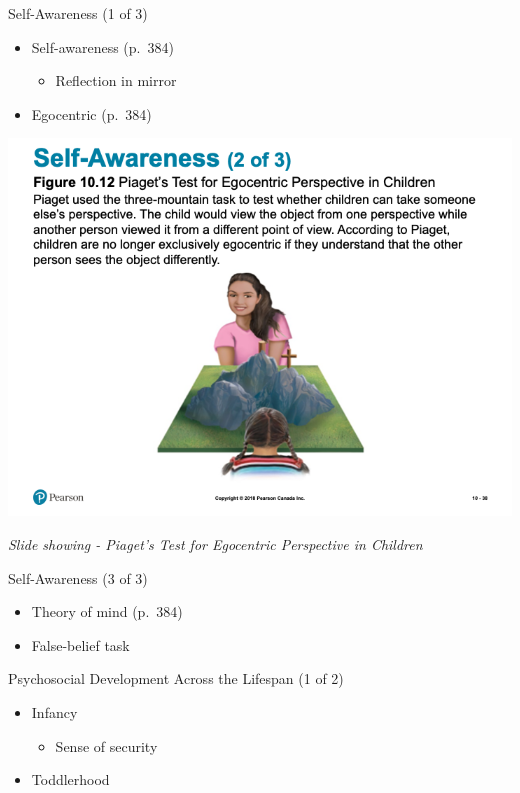 \documentclass[
]{book}
\providecommand{\tightlist}{%
  \setlength{\itemsep}{0pt}\setlength{\parskip}{0pt}}
\begin{document}
\begin{reflect}
Self-Awareness (1 of 3)

\begin{itemize}
\tightlist
\item
  Self-awareness (p.~384)

  \begin{itemize}
  \tightlist
  \item
    Reflection in mirror\\
  \end{itemize}
\item
  Egocentric (p.~384)
\end{itemize}

\includegraphics{assets/unit_3/slide_38.png}

\emph{Slide showing - Piaget's Test for Egocentric Perspective in Children}

Self-Awareness (3 of 3)

\begin{itemize}
\tightlist
\item
  Theory of mind (p.~384)\\
\item
  False-belief task
\end{itemize}

Psychosocial Development Across the Lifespan (1 of 2)

\begin{itemize}
\tightlist
\item
  Infancy

  \begin{itemize}
  \tightlist
  \item
    Sense of security\\
  \end{itemize}
\item
  Toddlerhood


\end{itemize}
\end{reflect}
\end{document}
